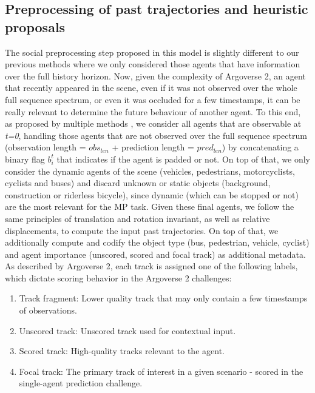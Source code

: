 \subsection{Preprocessing of past trajectories and heuristic proposals}
\label{subsec:4_improving_efficiency_preprocessing}

The social preprocessing step proposed in this model is slightly different to our previous methods where we only considered those agents that have information over the full history horizon. Now, given the complexity of Argoverse 2, an agent that recently appeared in the scene, even if it was not observed over the whole full sequence spectrum, or even it was occluded for a few timestamps, it can be really relevant to determine the future behaviour of another agent. To this end, as proposed by multiple methods \cite{liang2020learning, schmidt2022crat}, we consider all agents that are observable at \textit{t=0}, handling those agents that are not observed over the full sequence spectrum (observation length = \textit{$obs_{len}$} + prediction length = \textit{$pred_{len}$}) by concatenating a binary flag $b_i^t$ that indicates if the agent is padded or not. On top of that, we only consider the dynamic agents of the scene (vehicles, pedestrians, motorcyclists, cyclists and buses) and discard unknown or static objects (background, construction or riderless bicycle), since dynamic (which can be stopped or not) are the most relevant for the \ac{MP} task. Given these final agents, we follow the same principles of translation and rotation invariant, as well as relative displacements, to compute the input past trajectories. On top of that, we additionally compute and codify the object type (bus, pedestrian, vehicle, cyclist) and agent importance (unscored, scored and focal track) as additional metadata. As described by Argoverse 2, each track is assigned one of the following labels, which dictate scoring behavior in the Argoverse 2 challenges:

\begin{enumerate}
	\item Track fragment: Lower quality track that may only contain a few timestamps of observations.
	\item Unscored track: Unscored track used for contextual input.
	\item Scored track: High-quality tracks relevant to the agent.
	\item Focal track: The primary track of interest in a given scenario - scored in the single-agent prediction challenge.
\end{enumerate}

